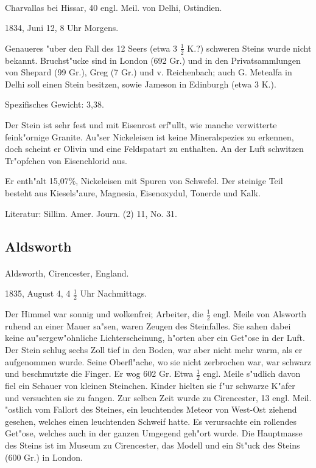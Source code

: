 \documentclass[a4paper, 11pt, oneside]{article}
\begin{document}
\paragraph{}
Charvallas bei Hissar, 40 engl. Meil. von Delhi, Ostindien.

1834, Juni 12, 8 Uhr Morgens.

Genaueres "uber den Fall des 12 Seers (etwa 3 $\frac{1}{2}$ K.?) schweren Steins wurde nicht bekannt. Bruchst"ucke sind in London (692 Gr.) und in den Privatsammlungen von Shepard (99 Gr.), Greg (7 Gr.) und v. Reichenbach; auch G. Metealfa in Delhi soll einen Stein besitzen, sowie Jameson in Edinburgh (etwa 3 K.).

Spezifisches Gewicht: 3,38.

Der Stein ist sehr fest und mit Eisenrost erf"ullt, wie manche verwitterte feink"ornige Granite. Au"ser Nickeleisen ist keine Mineralspezies zu erkennen, doch scheint er Olivin und eine Feldspatart zu enthalten. An der Luft schwitzen Tr"opfchen von Eisenchlorid aus.

Er enth"alt 15,07\%, Nickeleisen mit Spuren von Schwefel. Der steinige Teil besteht aus Kiesels"aure, Magnesia, Eisenoxydul, Tonerde und Kalk.

\footnotesize
Literatur: Sillim. Amer. Journ. (2) 11, No. 31.

\subsection{Aldsworth}
\normalsize
\paragraph{}
Aldsworth, Cirencester, England.

1835, August 4, 4 $\frac{1}{2}$ Uhr Nachmittags.

Der Himmel war sonnig und wolkenfrei; Arbeiter, die $\frac{1}{2}$ engl. Meile von Alsworth ruhend an einer Mauer sa"sen, waren Zeugen des Steinfalles. Sie sahen dabei keine au"sergew"ohnliche Lichterscheinung, h"orten aber ein Get"ose in der Luft. Der Stein schlug sechs Zoll tief in den Boden, war aber nicht mehr warm, als er aufgenommen wurde. Seine Oberfl"ache, wo sie nicht zerbrochen war, war schwarz und beschmutzte die Finger. Er wog 602 Gr. Etwa $\frac{1}{2}$ engl. Meile s"udlich davon fiel ein Schauer von kleinen Steinchen. Kinder hielten sie f"ur schwarze K"afer und versuchten sie zu fangen. Zur selben Zeit wurde zu Cirencester, 13 engl. Meil. "ostlich vom Fallort des Steines, ein leuchtendes Meteor von West-Ost ziehend gesehen, welches einen leuchtenden Schweif hatte. Es verursachte ein rollendes Get"ose, welches auch in der ganzen Umgegend geh"ort wurde. Die Hauptmasse des Steins ist im Museum zu Cirencester, das Modell und ein St"uck des Steins (600 Gr.) in London.
\end{document}

